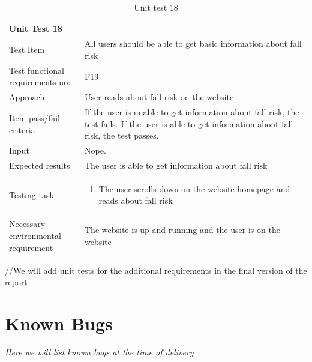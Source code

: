 \begin{table}[H]
\begin{tabular}{ | L{0.25\linewidth} | L{0.75\linewidth} | } 
 \hline {}
 Unit Test 18 &  \\
 \hline
 Test Item & All users should be able to get basic information about fall risk\\
 \hline
 Test functional requirements no: & F19
 \\
 \hline
 Approach & User reads about fall risk on the website\\
  \hline
 Item pass/fail criteria & If the user is unable to get information about fall risk, the test fails. If the user is able to get information about fall risk, the test passes.\\
 \hline
 Input & Nope.\\ 
 \hline
 Expected results & The user is able to get information about fall risk\\
  \hline
Testing task &
    \vspace{-5mm}
    \begin{enumerate}[noitemsep]
  \item The user scrolls down on the website homepage and reads about fall risk
   \end{enumerate}\\
 \hline
 Necessary environmental requirement & The website is up and running and the user is on the website\\
 \hline
\end{tabular}
\caption{Unit test 18}
\end{table}

//We will add unit tests for the additional requirements in the final version of the report

\chapter{Known Bugs}

\textit{Here we will list known bugs at the time of delivery}